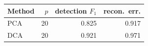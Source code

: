 \begin{tabular}{lrrr}
\toprule
Method & $p$ & detection $F_1$ & recon.\ err. \\
\midrule
PCA & 20 & 0.825 & 0.917 \\
DCA & 20 & 0.921 & 0.971 \\
\bottomrule
\end{tabular}
